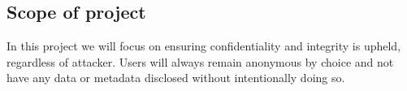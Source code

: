 \subsection{Scope of project}
\label{sec:scope}

In this project we will focus on ensuring confidentiality and
integrity is upheld, regardless of attacker. Users will always remain
anonymous by choice and not have any data or metadata disclosed
without intentionally doing so.

